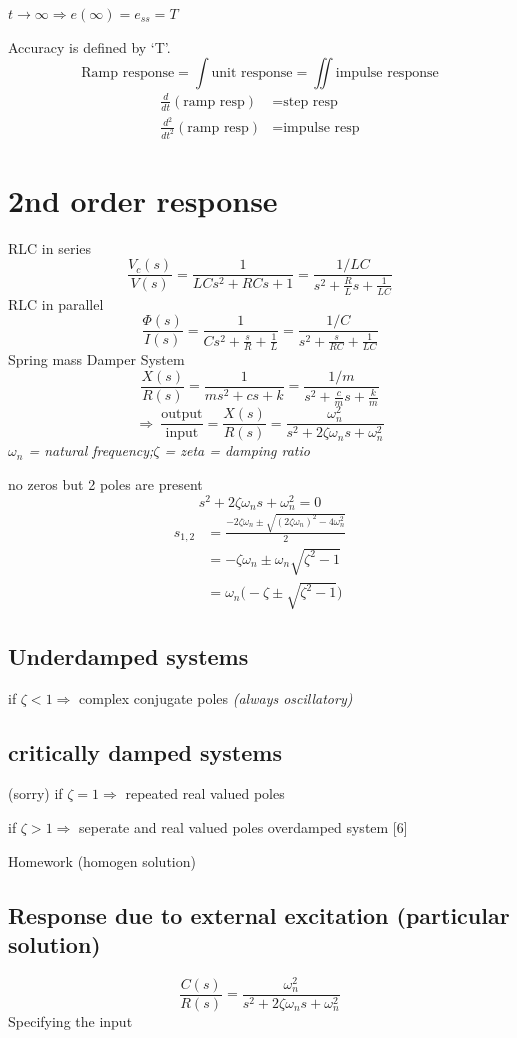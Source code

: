 \documentclass[11pt,a4paper]{article}
\begin{document}
$t\to\infty \Rightarrow e(\infty)=e_{ss}=T$

Accuracy is defined by `T'.
\[ \text{Ramp response}=\int \text{unit response}=\iint \text{impulse response} \]
\begin{align*}
\frac{d}{dt}(\text{ramp resp})&=\text{step resp}\\
\frac{d^2}{dt^2}(\text{ramp resp})&=\text{impulse resp}
\end{align*}

\section{2nd order response}
RLC in series
\[ \frac{V_c(s)}{V(s)}=\frac{1}{LCs^2+RCs+1}=\frac{1/LC}{s^2+\frac{R}{L}s+\frac{1}{LC}} \]
RLC in parallel
\[ \frac{\Phi(s)}{I(s)}=\frac{1}{Cs^2+\frac{s}{R}+\frac{1}{L}}=\frac{1/C}{s^2+\frac{s}{RC}+\frac{1}{LC}} \]
Spring mass Damper System
\[ \frac{X(s)}{R(s)}=\frac{1}{ms^2+cs+k}=\frac{1/m}{s^2+\frac{c}{m}s+\frac{k}{m}} \]
\[ \Rightarrow\ \frac{\text{output}}{\text{input}}=\frac{X(s)}{R(s)}=\frac{\omega_n^2}{s^2+2\zeta\omega_n s+\omega_n^2} \]
\textit{$\omega_n$ = natural frequency;\quad $\zeta$ = zeta = damping ratio}

no zeros but 2 poles are present
\[ s^2+2\zeta\omega_n s+\omega_n^2=0 \]
\begin{align*}
s_{1,2}&=\frac{-2\zeta\omega_n\pm\sqrt{(2\zeta\omega_n)^2-4\omega_n^2}}{2}\\
&=-\zeta\omega_n\pm\omega_n\sqrt{\zeta^2-1}\\
&=\omega_n\bigl(-\zeta\pm\sqrt{\zeta^2-1}\bigr)
\end{align*}
\subsection{Underdamped systems}
if $\zeta<1 \Rightarrow$ complex conjugate poles \textit{(always oscillatory)}
\subsection{critically damped systems}
(sorry) if $\zeta=1 \Rightarrow$ repeated real valued poles

if $\zeta>1 \Rightarrow$ seperate and real valued poles \qquad overdamped system
[6]

Homework (homogen solution)

\subsection{Response due to external excitation (particular solution)}
\[ \frac{C(s)}{R(s)}=\frac{\omega_n^2}{s^2+2\zeta\omega_n s+\omega_n^2} \]
Specifying the input
\end{document}

